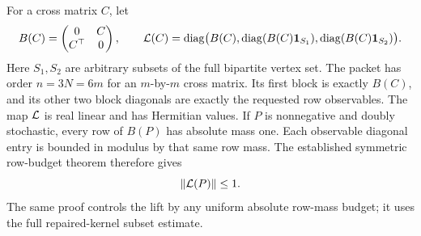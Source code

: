 For a cross matrix \(C\), let
\[
 B(C)=\begin{pmatrix}0&C\\C^\top&0\end{pmatrix},\qquad
 {\cal L}(C)=\operatorname{diag}
 \bigl(B(C),\operatorname{diag}(B(C)\mathbf1_{S_1}),\operatorname{diag}(B(C)\mathbf1_{S_2})\bigr).
\]
Here \(S_1,S_2\) are arbitrary subsets of the full bipartite vertex set.
The packet has order \(n=3N=6m\) for an \(m\)-by-\(m\) cross matrix.
Its first block is exactly \(B(C)\), and its other two block
diagonals are exactly the requested row observables.
The map \({\cal L}\) is real linear and has Hermitian values.
If \(P\) is nonnegative and doubly stochastic, every row of \(B(P)\)
has absolute mass one.
Each observable diagonal entry is bounded in modulus by that same
row mass.
The established symmetric row-budget theorem therefore gives
\[
 \|{\cal L}(P)\|\leq1.
\]
The same proof controls the lift by any uniform absolute row-mass
budget; it uses the full repaired-kernel subset estimate.

